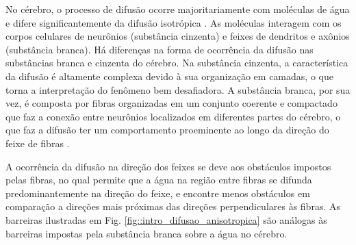 \documentclass[
    12pt,                %
    oneside,            %
    a4paper,            %
    english,            %
    french,                %
    spanish,            %
    brazil                %
    ]{abntex2}
\begin{document}
No cérebro, o processo de difusão ocorre majoritariamente com moléculas de água e difere significantemente da difusão isotrópica \cite{lebihan2006}. As moléculas interagem com os corpos celulares de neurônios (substância cinzenta) e feixes de dendritos e axônios (substância branca).
Há diferenças na forma de ocorrência da difusão nas substâncias branca e cinzenta do cérebro. Na substância cinzenta, a característica da difusão é altamente complexa devido à sua organização em camadas, o que torna a interpretação do fenômeno bem desafiadora. A substância branca, por sua vez, é composta por fibras organizadas em um conjunto coerente e compactado que faz a conexão entre neurônios localizados em diferentes partes do cérebro, o que faz a difusão ter um comportamento proeminente ao longo da direção do feixe de fibras \cite{DTI_Handbook}.

A ocorrência da difusão na direção dos feixes se deve aos obstáculos impostos pelas fibras, no qual permite que a água na região entre fibras se difunda predominantemente na direção do feixe, e encontre menos obstáculos em comparação a direções mais próximas das direções perpendiculares às fibras. As barreiras ilustradas em Fig. \ref{fig::intro_difusao_anisotropica} são análogas 
às barreiras impostas pela substância branca sobre a água no cérebro.
\end{document}
